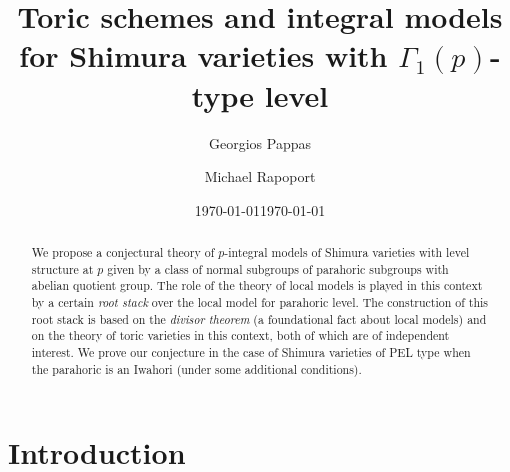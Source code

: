 \documentclass[reqno, 10pt]{amsart}
\theoremstyle{definition}
\numberwithin{equation}{subsection}
\numberwithin{subsubsection}{subsection}
\begin{document}
 
 
 
 

\setcounter{tocdepth}{1}

\title[Toric schemes and integral models for Shimura varieties]{Toric schemes and integral models for Shimura varieties with $\Gamma_1(p)$-type level}
\author[G. Pappas]{Georgios Pappas}
\address{Department of Mathematics, Michigan State University, E. Lansing, MI 48824, USA}

\author[M. Rapoport]{Michael Rapoport}
\address{Mathematisches Institut der Universit\"at Bonn, Endenicher Allee 60, 53115 Bonn, Germany}


\date{\today}

\begin{abstract} We propose a conjectural theory of $p$-integral models of Shimura varieties with level structure at $p$ given by a class of normal subgroups of parahoric subgroups with abelian quotient group. The role of the theory of local models  is played in this context by a certain \emph{root stack} over the local model for parahoric level. The construction of this root stack is based on the \emph{divisor theorem} (a foundational fact about local models) and on the theory of toric varieties in this context, both of which are of independent interest. We prove our conjecture in the case of Shimura varieties of PEL type when the parahoric is an Iwahori (under some additional conditions). 
\end{abstract}

\maketitle

\tableofcontents
 
  


 
\date{\today}
\maketitle



\section{Introduction} 
\end{document}
